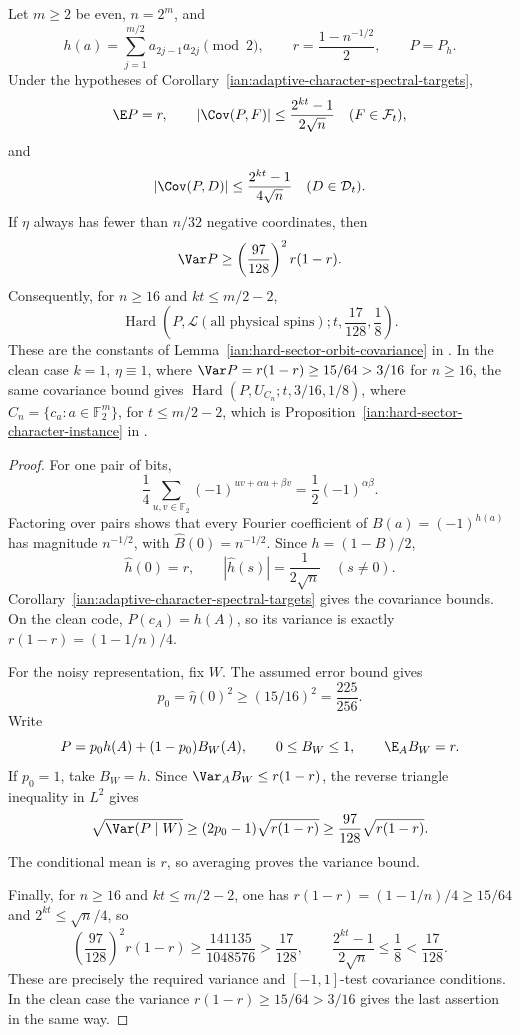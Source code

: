 \begin{corollary}\label{ian:adaptive-character-quadratic-benchmark}
Let \(m\ge2\) be even, \(n=2^m\), and
\[
 h(a)=\sum_{j=1}^{m/2}a_{2j-1}a_{2j}\pmod2,
 \qquad
 r=\frac{1-n^{-1/2}}2,
 \qquad
 P=P_h.
\]
Under the hypotheses of Corollary~\ref{ian:adaptive-character-spectral-targets},
\[
 \E P=r,\qquad
 |\Cov(P,F)|\le\frac{2^{kt}-1}{2\sqrt n}
 \quad(F\in\mathcal F_t),
\]
and
\[
 |\Cov(P,D)|\le\frac{2^{kt}-1}{4\sqrt n}
 \quad(D\in\mathcal D_t).
\]
If \(\eta\) always has fewer than \(n/32\) negative coordinates, then
\[
 \Var P\ge\left(\frac{97}{128}\right)^2r(1-r).
\]
Consequently, for \(n\ge16\) and \(kt\le m/2-2\),
\[
 \operatorname{Hard}\left(
 P,\mathcal L(\text{all physical spins});
 t,\frac{17}{128},\frac18
 \right).
\]
These are the constants of Lemma~\ref{ian:hard-sector-orbit-covariance} in
.
In the clean case \(k=1\), \(\eta\equiv1\), where \(\Var P=r(1-r)\ge15/64>3/16\) for \(n\ge16\), the same covariance bound gives \(\operatorname{Hard}(P,U_{C_n};t,3/16,1/8)\), where \(C_n=\{c_a:a\in\mathbb F_2^m\}\), for \(t\le m/2-2\), which is Proposition~\ref{ian:hard-sector-character-instance} in
.
\end{corollary}
\begin{proof}
For one pair of bits,
\[
 \frac14\sum_{u,v\in\mathbb F_2}
 (-1)^{uv+\alpha u+\beta v}
 =\frac12(-1)^{\alpha\beta}.
\]
Factoring over pairs shows that every Fourier coefficient of
\(B(a)=(-1)^{h(a)}\) has magnitude \(n^{-1/2}\), with
\(\widehat B(0)=n^{-1/2}\). Since \(h=(1-B)/2\),
\[
 \widehat h(0)=r,\qquad
 |\widehat h(s)|=\frac1{2\sqrt n}\quad(s\ne0).
\]
Corollary~\ref{ian:adaptive-character-spectral-targets} gives the covariance bounds. On the clean code, \(P(c_A)=h(A)\), so its variance is exactly \(r(1-r)=(1-1/n)/4\).

For the noisy representation, fix \(W\). The assumed error bound gives
\[
 p_0=\widehat\eta(0)^2\ge(15/16)^2=\frac{225}{256}.
\]
Write
\[
 P=p_0h(A)+(1-p_0)B_W(A),
 \qquad
 0\le B_W\le1,\qquad \E_A B_W=r.
\]
If \(p_0=1\), take \(B_W=h\). Since
\(\Var_A B_W\le r(1-r)\), the reverse triangle inequality in \(L^2\) gives
\[
 \sqrt{\Var(P\mid W)}
 \ge(2p_0-1)\sqrt{r(1-r)}
 \ge\frac{97}{128}\sqrt{r(1-r)}.
\]
The conditional mean is \(r\), so averaging proves the variance bound.

Finally, for \(n\ge16\) and \(kt\le m/2-2\), one has \(r(1-r)=(1-1/n)/4\ge15/64\) and \(2^{kt}\le\sqrt n/4\), so
\[
 \left(\frac{97}{128}\right)^2r(1-r)
 \ge\frac{141135}{1048576}>\frac{17}{128},
 \qquad
 \frac{2^{kt}-1}{2\sqrt n}\le\frac18<\frac{17}{128}.
\]
These are precisely the required variance and \([-1,1]\)-test covariance conditions. In the clean case the variance \(r(1-r)\ge15/64>3/16\) gives the last assertion in the same way.
\end{proof}

